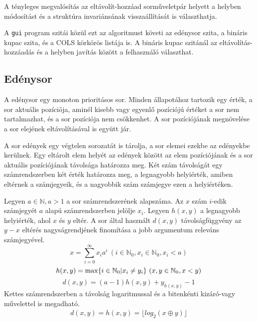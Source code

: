 A tényleges megvalósítás az eltávolít-hozzáad sorműveletpár helyett a helyben módosítást és a struktúra invariánsának visszaállítását is választhatja.

A \texttt{gui} program szitái közül ezt az algoritmust követi az edénysor szita, a bináris kupac szita, és a COLS körkörös listája is. A bináris kupac szitánál az eltávolítás-hozzáadás és a helyben javítás között a felhasználó választhat.

\subsection{Edénysor}

A edénysor egy monoton prioritásos sor.
Minden állapotához tartozik egy érték, a sor aktuális pozíciója, aminél kisebb vagy egyenlő pozíciójú értéket a sor nem tartalmazhat, és a sor pozíciója nem csökkenhet.
A sor pozíciójának megnövelése a sor elejének eltávolításával is együtt jár.

A sor edények egy végtelen sorozatát is tárolja, a sor elemei ezekbe az edényekbe kerülnek.
Egy eltárolt elem helyét az edények között az elem pozíciójának és a sor aktuális pozíciójának távolsága határozza meg.
Két szám távolságát egy számrendszerben két érték határozza meg, a legnagyobb helyiérték, amiben eltérnek a számjegyeik, és a nagyobbik szám számjegye ezen a helyiértéken.

Legyen $a \in \mathbb{N}, a > 1$ a sor számrendszerének alapszáma.
Az $x$ szám $i$-edik számjegyét $a$ alapú számrendszerben jelölje $x_i$.
Legyen $h(x, y)$ a legnagyobb helyiérték, ahol $x$ és $y$ eltér.
A sor által használt $d(x, y)$ távolságfüggvény az $y-x$ eltérés nagyságrendjének finomítása a jobb argumentum releváns számjegyével.
\begin{equation}
x = \sum_{i=0}^{\infty} x_i a^i\ (i \in \mathbb{N}_0, x_i \in \mathbb{N}_0, x_i < a)
\end{equation}
\begin{equation}
h(x, y) = \max \lbrace i \in \mathbb{N}_0 | x_i \not= y_i\rbrace \ (x, y \in \mathbb{N}_0, x<y)\\
\end{equation}
\begin{equation}
\label{ddef}
d(x, y) = (a-1) h(x, y) + y_{h(x, y)} - 1
\end{equation}
Kettes számrendszerben a távolság logaritmussal és a bitenkénti kizáró-vagy művelettel is megadható.
\begin{align*}
d(x, y) = h(x, y) = \lfloor log_2{(x \oplus y)} \rfloor
\end{align*}

